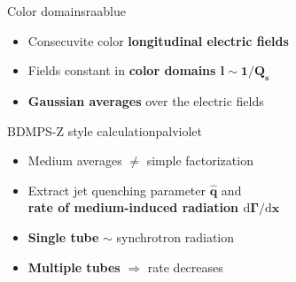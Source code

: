 \documentclass[aspectratio=169,11pt,usenames,dvipsnames]{beamer}
\begin{document}
\begin{frame}[noframenumbering]
\begin{center}
\begin{columns}[onlytextwidth,t]
            \begin{center}
                \begin{custombox2}{\normalsize Color domains}{raablue}
                    \small
                    \begin{varwidth}{0.89\textwidth}
                    \begin{itemize}\itemsep0em 
                        \itemsep0em
                        \footnotesize
                        \item Consecuvite color {\bfseries\color{raablue}longitudinal electric fields}
                        \item Fields constant in {\bfseries\color{jyured}color domains $\boldsymbol{l\sim 1/Q_s}$}
                        \item {\bfseries\color{raablue} Gaussian averages} over the electric fields
                    \end{itemize}
                    \end{varwidth}
                \end{custombox2}
                \begin{custombox2}{\normalsize BDMPS-Z style calculation}{palviolet}
                    \small
                    \begin{varwidth}{0.89\textwidth}
                    \begin{itemize}\itemsep0em 
                        \itemsep0em
                        \footnotesize
                        \item Medium averages $\neq$ simple factorization
                        \item Extract jet quenching parameter $\boldsymbol{\hat{q}}$ and \\{\bfseries\color{palviolet} rate of medium-induced radiation $\boldsymbol{\mathrm{d}\Gamma/\mathrm{d}x}$}
                        \item {\bfseries\color{raablue}Single tube} $\sim$ synchrotron radiation 
                        \item {\bfseries\color{raablue}Multiple tubes} $\Rightarrow$ rate decreases

\end{itemize}
\end{varwidth}
\end{custombox2}
\end{center}
\end{columns}
\end{center}
\end{frame}
\end{document}
